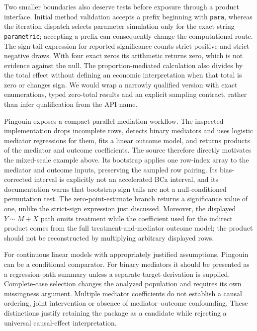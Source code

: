 Two smaller boundaries also deserve tests before exposure through a product interface. Initial method validation accepts a prefix beginning with \texttt{para}, whereas the iteration dispatch selects parameter simulation only for the exact string \texttt{parametric}; accepting a prefix can consequently change the computational route. The sign-tail expression for reported significance counts strict positive and strict negative draws. With four exact zeros its arithmetic returns zero, which is not evidence against the null. The proportion-mediated calculation also divides by the total effect without defining an economic interpretation when that total is zero or changes sign. We would wrap a narrowly qualified version with exact enumerations, typed zero-total results and an explicit sampling contract, rather than infer qualification from the API name.\cite{exec25_pymed_statsmodels,exec25_pymed_choice}

Pingouin exposes a compact parallel-mediation workflow. The inspected implementation drops incomplete rows, detects binary mediators and uses logistic mediator regressions for them, fits a linear outcome model, and returns products of the mediator and outcome coefficients. The source therefore directly motivates the mixed-scale example above. Its bootstrap applies one row-index array to the mediator and outcome inputs, preserving the sampled row pairing. Its bias-corrected interval is explicitly not an accelerated BCa interval, and its documentation warns that bootstrap sign tails are not a null-conditioned permutation test. The zero-point-estimate branch returns a significance value of one, unlike the strict-sign expression just discussed. Moreover, the displayed $Y\sim M+X$ path omits treatment while the coefficient used for the indirect product comes from the full treatment-and-mediator outcome model; the product should not be reconstructed by multiplying arbitrary displayed rows.\cite{exec25_pymed_pingouin}

For continuous linear models with appropriately justified assumptions, Pingouin can be a conditional comparator. For binary mediators it should be presented as a regression-path summary unless a separate target derivation is supplied. Complete-case selection changes the analyzed population and requires its own missingness argument. Multiple mediator coefficients do not establish a causal ordering, joint intervention or absence of mediator--outcome confounding. These distinctions justify retaining the package as a candidate while rejecting a universal causal-effect interpretation.\cite{exec25_pymed_pingouin,exec25_pymed_choice}


